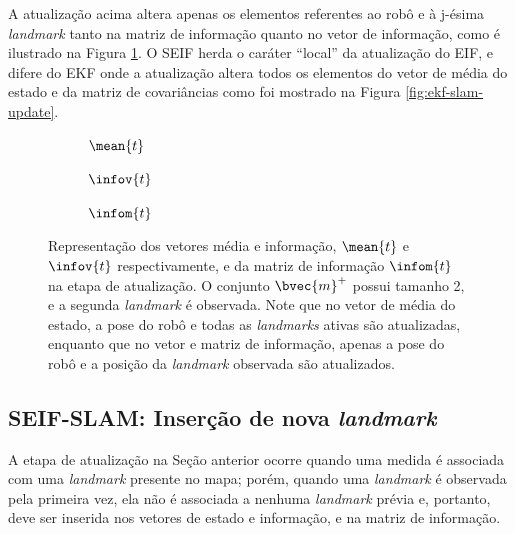A atualização acima altera apenas os elementos referentes ao robô e à 
j-ésima \textit{landmark} tanto na matriz de informação quanto no vetor 
de informação, como é ilustrado na Figura \ref{fig:seif-slam-update}. O SEIF 
herda o caráter ``local'' da atualização do EIF, e difere do EKF onde a 
atualização altera todos os elementos do vetor de média do estado e da matriz de 
covariâncias como foi mostrado na Figura \ref{fig:ekf-slam-update}.
\begin{figure}[h]
  \begin{subfigure}{.30\textwidth}
    
    \caption{$\mean{t}$}
  \end{subfigure}
  \hfill
  \begin{subfigure}{.30\textwidth}
    
    \caption{$\infov{t}$}
  \end{subfigure}
  \hfill
  \begin{subfigure}{.3\textwidth}
    
    \caption{$\infom{t}$}
  \end{subfigure}
  \caption{Representação dos vetores média e informação, $\mean{t}$ e $\infov{t}$ respectivamente, e da matriz de informação $\infom{t}$ na 
  etapa de atualização. O conjunto $\bvec{m}^+$ possui tamanho 2, e a 
  segunda \textit{landmark} é observada. Note que no vetor de média do estado, 
  a pose do robô e todas as \textit{landmarks} ativas são atualizadas, 
  enquanto que no vetor e matriz de informação, apenas a pose do robô e 
  a posição da \textit{landmark} observada são atualizados.}
  \label{fig:seif-slam-update}
\end{figure}

\subsection{SEIF-SLAM: Inserção de nova \textit{landmark}}
A etapa de atualização na Seção anterior ocorre quando uma medida é 
associada com uma \textit{landmark} presente no mapa; porém, quando 
uma \textit{landmark} é observada pela primeira vez, ela não é 
associada a nenhuma \textit{landmark} prévia e, portanto, deve ser 
inserida nos vetores de estado e informação, e na matriz de informação. 

